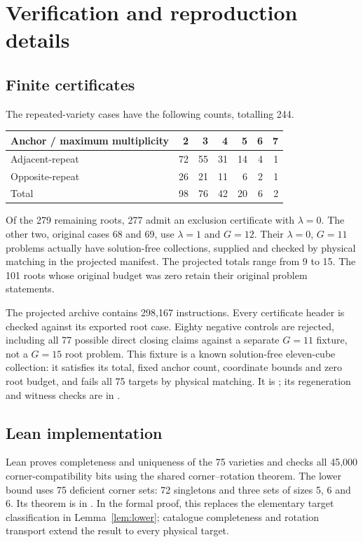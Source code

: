 \section{Verification and reproduction details}\label{app:verification}
\subsection{Finite certificates}
The repeated-variety cases have the following counts,
totalling 244.
\begin{center}
\begin{tabular}{lrrrrrr}
\toprule
Anchor / maximum multiplicity & 2 & 3 & 4 & 5 & 6 & 7\\
\midrule
Adjacent-repeat & 72 & 55 & 31 & 14 & 4 & 1\\
Opposite-repeat & 26 & 21 & 11 & 6 & 2 & 1\\
Total & 98 & 76 & 42 & 20 & 6 & 2\\
\bottomrule
\end{tabular}
\end{center}

Of the 279 remaining roots, 277 admit an exclusion certificate with $\lambda=0$. The other two, original
cases 68 and 69, use $\lambda=1$ and $G=12$. Their $\lambda=0$, $G=11$ problems actually
have solution-free collections, supplied and checked by physical matching in
the projected manifest. The projected totals range from 9 to 15. The 101 roots
whose original budget was zero retain their original problem statements.

The projected archive contains 298,167 instructions. Every certificate header
is checked against its exported root case. Eighty
negative controls are rejected, including all 77 possible direct closing
claims against a separate $G=11$ fixture, not a $G=15$ root problem.
This fixture is a known solution-free eleven-cube collection: it satisfies
its total, fixed anchor count, coordinate bounds and zero root budget, and
fails all 75 targets by physical matching. It is ; its regeneration and witness
checks are in .

\subsection{Lean implementation}
Lean proves completeness and uniqueness of the 75 varieties and checks all
45,000 corner-compatibility bits using the shared corner--rotation theorem.
The lower bound uses 75 deficient corner sets: 72 singletons and three
sets of sizes 5, 6 and 6. Its theorem is
 in . In the formal proof, this replaces the elementary
target classification in Lemma~\ref{lem:lower}; catalogue completeness and
rotation transport extend the result to every physical target.

